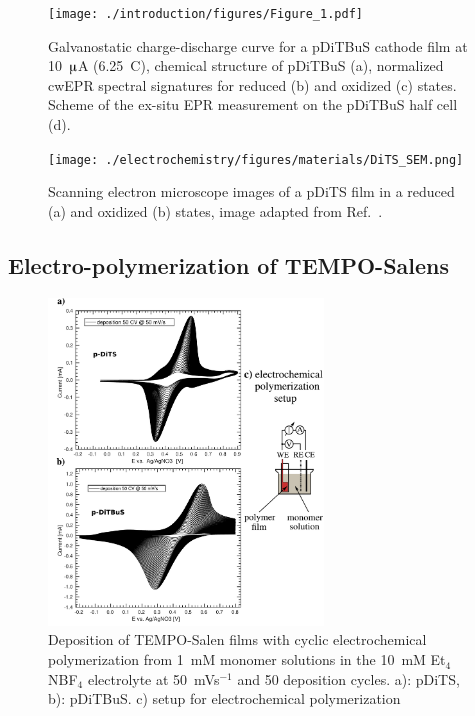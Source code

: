 \begin{figure}
	\texttt{[image: ./introduction/figures/Figure\_1.pdf]}
	\caption{Galvanostatic charge-discharge curve for a pDiTBuS cathode film at 10~$\muup$A (6.25~C), chemical structure of pDiTBuS (a), normalized cwEPR spectral signatures for reduced (b) and oxidized (c) states. Scheme of the ex-situ EPR measurement on the pDiTBuS half cell (d).}
	\label{fig:Figure_1}
\end{figure}



\begin{figure}%
	\texttt{[image: ./electrochemistry/figures/materials/DiTS\_SEM.png]}
	\caption{Scanning electron microscope images of a pDiTS film in a reduced (a) and oxidized (b) states, image adapted from Ref.~\cite{Vereshchagin2020}.}
	\label{fig:Figure_1}
\end{figure}


\subsection{Electro-polymerization of TEMPO-Salens}
\begin{figure}%
	\includegraphics[width=0.65\textwidth]{./electrochemistry/figures/DITBUS_DEPO.pdf}
	\caption{Deposition of TEMPO-Salen films with cyclic electrochemical polymerization from 1~mM monomer solutions in the 10~mM Et$_4$NBF$_4$ electrolyte at 50~mVs$^{-1}$ and 50 deposition cycles. a): pDiTS, b): pDiTBuS. c) setup for electrochemical polymerization}
	\label{fig:DITBUS_DEPO}
\end{figure}

